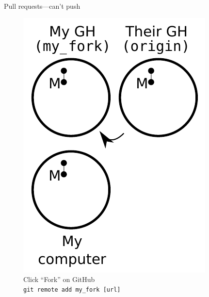 \begin{frame}{Pull requests---can't push}
  \begin{figure}
    \includegraphics{fork_003.pdf}
    \\ Click ``Fork'' on GitHub
    \\ \texttt{git remote add my\_fork [url]}
  \end{figure}
\end{frame}

